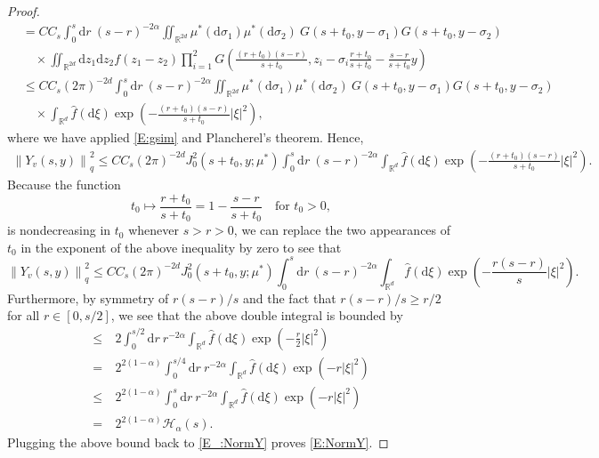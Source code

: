 \documentclass[12pt]{report}
\theoremstyle{plain}
\theoremstyle{definition}
\numberwithin{equation}{section}
\newcommand{\R}{\mathbb{R}}
\newcommand{\Norm}[1]{\left\|  #1   \right\|}
\newcommand{\ud}{\ensuremath{ \mathrm{d} }}
\begin{document}
\begin{proof}
\begin{align*}
	& = C C_s\int_0^s \ud r \: (s-r)^{-2\alpha} \iint_{\R^{2d}} \mu^*(\ud \sigma_1) \mu^*(\ud \sigma_2)\: G(s + t_0,y-\sigma_1)G(s + t_0,y-\sigma_2)                           \\
	& \quad \times\iint_{\R^{2d}} \ud z_1\ud z_2 f(z_1-z_2)  \prod_{i=1}^2 G\left(\frac{(r+t_0)(s-r)}{s + t_0}, z_i-\sigma_i\frac{r + t_0}{s + t_0}-\frac{s-r}{s+t_0}y \right) \\
	& \le C C_s(2\pi)^{-2d} \int_0^s \ud r \: (s-r)^{-2\alpha} \iint_{\R^{2d}}\mu^*(\ud \sigma_1) \mu^*(\ud \sigma_2)\: G(s + t_0,y-\sigma_1)G(s + t_0, y-\sigma_2)            \\
	& \quad \times \int_{\R^d} \widehat{f}(\ud \xi) \exp\left(-\frac{(r + t_0)(s-r)}{s+ t_0}|\xi|^2\right),
	\end{align*}
	where we have applied \eqref{E:gsim} and Plancherel's theorem. Hence,
	\begin{align*}
	\Norm{Y_v(s,y)}_q^2 \le C C_s (2\pi)^{-2d} J_0^2\left(s + t_0,y;\mu^*\right) \int_0^s \ud r \: (s-r)^{-2\alpha} \int_{\R^d} \widehat{f}(\ud \xi)\exp\left(-\frac{(r + t_0)(s-r)}{s + t_0}|\xi|^2\right).
	\end{align*}
	Because the function
	\[
	t_0 \mapsto \frac{r + t_0}{s + t_0} = 1- \frac{s-r}{s+t_0} \quad \text{for } t_0 > 0,
	\]
	is nondecreasing in $t_0 $ whenever $s > r > 0$, we can replace the two appearances of $t_0$ in
	the exponent of the above inequality by zero to see that
	\begin{equation} \label{E_:NormY}
	\Norm{Y_v(s,y)}_q^2 \le C C_s (2\pi)^{-2d} J_0^2(s + t_0,y;\mu^*) \int_0^s \ud r \: (s-r)^{-2\alpha} \int_{\R^d} \widehat{f}(\ud \xi)\exp\left(-\frac{r(s-r)}{s}|\xi|^2\right).
	\end{equation}
	Furthermore, by symmetry of $r(s-r)/s$ and the fact that $r(s-r)/s \ge r/2$ for all $r\in
	[0,s/2]$, we see that the above double integral is bounded by
	\begin{align*}
	\le & \: 2\int_0^{s/2} \ud r \: r^{-2\alpha}\int_{\R^d} \widehat{f}(\ud \xi)\exp\left(-\frac{r}{2}|\xi|^2\right)      \\
	=   & \: 2^{2(1-\alpha)} \int_0^{s/4} \ud r \: r^{-2\alpha}\int_{\R^d} \widehat{f}(\ud \xi)\exp\left(-r|\xi|^2\right) \\
	\le & \: 2^{2(1-\alpha)} \int_0^{s} \ud r \: r^{-2\alpha}\int_{\R^d} \widehat{f}(\ud \xi)\exp\left(-r|\xi|^2\right)   \\
	=   & \: 2^{2(1-\alpha)} \mathcal{H}_\alpha(s).
	\end{align*}
	Plugging the above bound back to \eqref{E_:NormY} proves \eqref{E:NormY}. \bigskip
	\bigskip
	

\end{proof}
\end{document}
